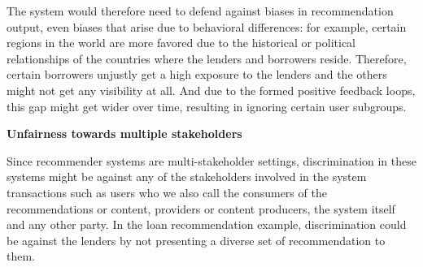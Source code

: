 The system would therefore need to defend against biases in recommendation output, even biases that arise due to behavioral differences: for example, certain regions in the world are more favored due to the historical or political relationships of the countries where the lenders and borrowers reside. Therefore, certain borrowers unjustly get a high exposure to the lenders and the others might not get any visibility at all. And due to the formed positive feedback loops, this gap might get wider over time, resulting in ignoring certain user subgroups.




\textbf{Unfairness towards multiple stakeholders}

Since recommender systems are multi-stakeholder settings, discrimination in these systems might be against any of the stakeholders involved in the system transactions such as users who we also call the consumers of the recommendations or content, providers or content producers, the system itself and any other party. In the loan recommendation example, discrimination could be against the lenders by not presenting a diverse set of recommendation to them.


